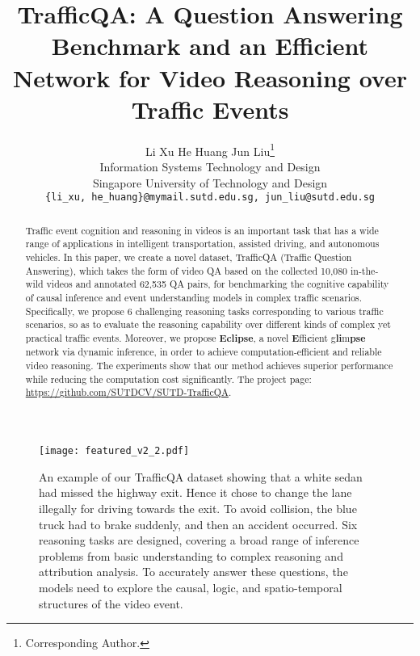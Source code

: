 \documentclass[final]{cvpr}
\begin{document}
\title{TrafficQA: A Question Answering Benchmark and an Efficient Network for Video Reasoning over Traffic Events}
\author{Li Xu \qquad He Huang \qquad Jun Liu\thanks{Corresponding Author.} \\
Information Systems Technology and Design \\
Singapore University of Technology and Design \\
{\tt\small \{li\_xu, he\_huang\}@mymail.sutd.edu.sg, jun\_liu@sutd.edu.sg}}


\maketitle
\pagestyle{empty}
\thispagestyle{empty}

\begin{figure*}[htbp]
\begin{center}
    \texttt{[image: featured\_v2\_2.pdf]}
\end{center}
\vspace{-0.6cm}
    \caption{An example of our TrafficQA dataset showing that a white sedan had missed the highway exit. Hence it chose to change the lane illegally for driving towards the exit. To avoid collision, the blue truck had to brake suddenly, and then an accident occurred.
Six reasoning tasks are designed, covering a broad range of inference problems from basic understanding to complex reasoning and attribution analysis.
    To accurately answer these questions, the models need to explore the causal, logic, and spatio-temporal structures of the video event.
    }
\label{fig:example}
\vspace{-0.2cm}
\end{figure*}




\begin{abstract}
Traffic event cognition and reasoning in videos is an important task that has a wide range of applications in intelligent transportation, assisted driving, and autonomous vehicles.
In this paper, we create a novel dataset, TrafficQA (Traffic Question Answering), which takes the form of video QA based on the collected 10,080 in-the-wild videos and annotated 62,535 QA pairs, for benchmarking the cognitive capability of 
causal inference and event understanding models in complex traffic scenarios.
Specifically, we propose 6 challenging reasoning tasks corresponding to various traffic scenarios, so as to evaluate the reasoning capability over different kinds of complex yet practical traffic events. 
Moreover, we propose \textbf{Eclipse}, a novel \textbf{E}ffi\textbf{c}ient g\textbf{li}m\textbf{pse} network via dynamic inference, in order to achieve computation-efficient and reliable video reasoning. The experiments show that our method achieves superior performance while reducing the computation cost significantly. The project page: \url{https://github.com/SUTDCV/SUTD-TrafficQA}.


\end{abstract}
\end{document}
